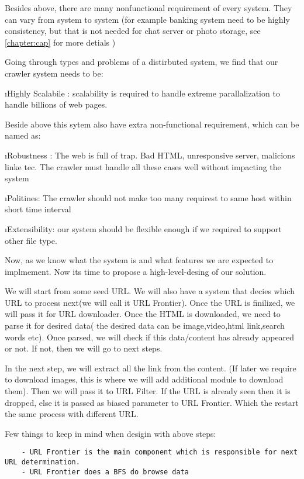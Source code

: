 Besides above, there are many nonfunctional requirement of every system. They can vary from system to system (for example banking system need to be highly consistency, but that is not needed for chat server or photo storage, see \ref{chapter:cap} for more detials )

Going through types and problems of a distirbuted system, we find that our crawler system needs to be:

\ls
\i Highly Scalabile : scalability is required to handle extreme parallalization to handle billions of web pages.

Beside above this sytem also have extra non-functional requirement, which can be named as:

\i Robustness : The web is full of trap. Bad HTML, unresponsive server, malicions linke tec. The crawler must handle all these cases well without impacting the system

\i Politines: The crawler should not make too many requirest to same host within short time interval

\i Extensibility: our system should be flexible enough if we required to support other file type.
\le


Now, as we know what the system is and what features we are expected to implmement. Now its time to propose a high-level-desing of our solution.

We will start from some seed URL. We will also have a system that decies which URL to process next(we will call it URL Frontier). Once the URL is finilized, we will pass it for URL downloader. Once the HTML is downloaded, we need to parse it for desired data( the desired data can be image,video,html link,search words etc). Once parsed, we will check if this data/content has already appeared or not. If not, then we will go to next steps.

In the next step, we will extract all the link from the content. (If later we require to download images, this is where we will add additional module to download them). Then we will pass it to URL Filter. If the URL is already seen then it is dropped, else it is passed as biased parameter to URL Frontier. Which the restart the same process with different URL. 

Few things to keep in mind when desigin with above steps:
\begin{lstlisting}
    - URL Frontier is the main component which is responsible for next URL determination.
    - URL Frontier does a BFS do browse data
\end{lstlisting}